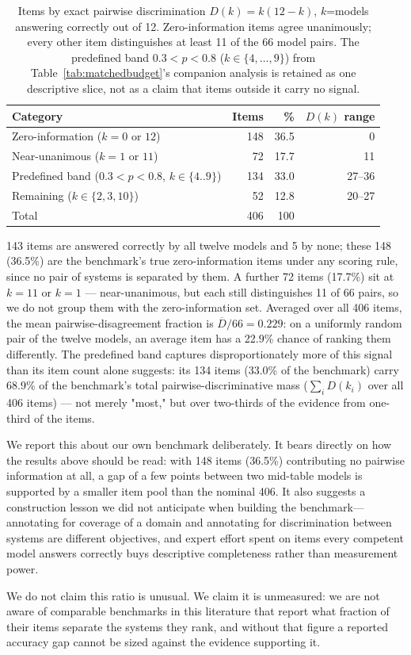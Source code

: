 \begin{table}[t]
\centering
\caption{Items by exact pairwise discrimination $D(k)=k(12-k)$, $k$=models answering correctly out
of 12. Zero-information items agree unanimously; every other item distinguishes at least 11 of the
66 model pairs. The predefined band $0.3<p<0.8$ ($k\in\{4,\ldots,9\}$) from Table~\ref{tab:matchedbudget}'s
companion analysis is retained as one descriptive slice, not as a claim that items outside it carry
no signal.}
\label{tab:effsize}
\begin{tabular}{lrrr}
\toprule
Category & Items & \% & $D(k)$ range \\
\midrule
Zero-information ($k=0$ or $12$)         & 148 & 36.5 & 0 \\
Near-unanimous ($k=1$ or $11$)           & 72  & 17.7 & 11 \\
Predefined band ($0.3<p<0.8$, $k\in\{4..9\}$) & 134 & 33.0 & 27--36 \\
Remaining ($k\in\{2,3,10\}$)             & 52  & 12.8 & 20--27 \\
\midrule
Total                                     & 406 & 100  & \\
\bottomrule
\end{tabular}
\end{table}

143 items are answered correctly by all twelve models and 5 by none; these 148 (36.5\%) are the
benchmark's true zero-information items under any scoring rule, since no pair of systems is
separated by them. A further 72 items (17.7\%) sit at $k=11$ or $k=1$ --- near-unanimous, but each
still distinguishes 11 of 66 pairs, so we do not group them with the zero-information set. Averaged
over all 406 items, the mean pairwise-disagreement fraction is $\overline{D}/66 = 0.229$: on a
uniformly random pair of the twelve models, an average item has a 22.9\% chance of ranking them
differently. The predefined band captures disproportionately more of this signal than its item
count alone suggests: its 134 items (33.0\% of the benchmark) carry 68.9\% of the benchmark's total
pairwise-discriminative mass ($\sum_i D(k_i)$ over all 406 items) --- not merely "most," but over
two-thirds of the evidence from one-third of the items.

We report this about our own benchmark deliberately. It bears directly on how the results above
should be read: with 148 items (36.5\%) contributing no pairwise information at all, a gap of a few
points between two mid-table models is supported by a smaller item pool than the nominal 406. It
also suggests a construction lesson we did not anticipate when building the benchmark---annotating
for coverage of a domain and annotating for discrimination between systems are different
objectives, and expert effort spent on items every competent model answers correctly buys
descriptive completeness rather than measurement power.

We do not claim this ratio is unusual. We claim it is unmeasured: we are not aware of comparable
benchmarks in this literature that report what fraction of their items separate the systems they
rank, and without that figure a reported accuracy gap cannot be sized against the evidence
supporting it.
